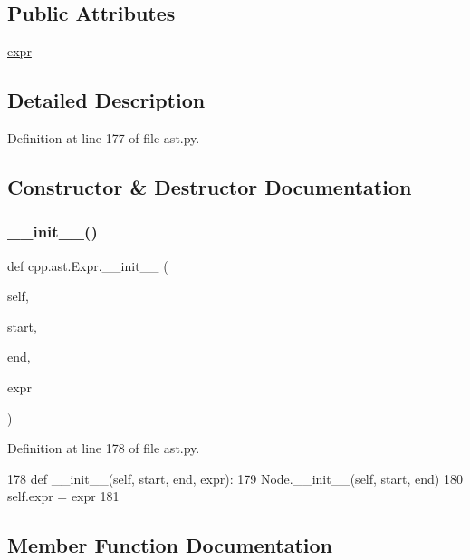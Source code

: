 \subsection*{Public Attributes}
\begin{DoxyCompactItemize}
\item 
\hyperlink{classcpp_1_1ast_1_1Expr_a2f4e13fb0176f2616f8703103c806462}{expr}
\end{DoxyCompactItemize}


\subsection{Detailed Description}


Definition at line 177 of file ast.\+py.



\subsection{Constructor \& Destructor Documentation}
\mbox{\label{classcpp_1_1ast_1_1Expr_adc83f4b17d6e28a39781678692eb25aa}} 
\subsubsection{\texorpdfstring{\+\_\+\+\_\+init\+\_\+\+\_\+()}{\_\_init\_\_()}}
{\footnotesize\ttfamily def cpp.\+ast.\+Expr.\+\_\+\+\_\+init\+\_\+\+\_\+ (\begin{DoxyParamCaption}\item[{}]{self,  }\item[{}]{start,  }\item[{}]{end,  }\item[{}]{expr }\end{DoxyParamCaption})}



Definition at line 178 of file ast.\+py.


\begin{DoxyCode}
178     \textcolor{keyword}{def }\_\_init\_\_(self, start, end, expr):
179         Node.\_\_init\_\_(self, start, end)
180         self.expr = expr
181 
\end{DoxyCode}


\subsection{Member Function Documentation}
\mbox{\label{classcpp_1_1ast_1_1Expr_a7ee1896fbfa7819adbd0b2f89d11ecec}} 
